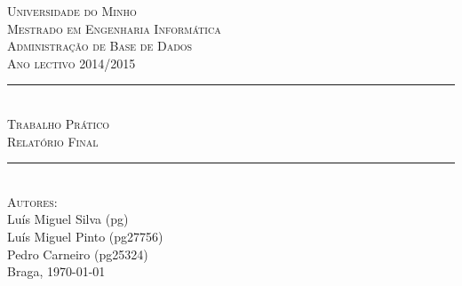 \begin{titlepage}
\onehalfspacing

\newcommand{\HRule}{\rule{\linewidth}{0.5mm}} %

\center %
 

\textsc{\LARGE Universidade do Minho}\\[1.5cm] %
\textsc{\Large Mestrado em Engenharia Informática}\\[0.5cm] %
\textsc{\large Administração de Base de Dados}\\[0.5cm] %
\textsc{Ano lectivo 2014/2015}\\[0.5cm]


\HRule \\[0.4cm]
\textsc{\Large Trabalho Prático}\\[0.4cm] %
\textsc{ \large Relatório Final}\\[0.4cm] %
\HRule \\[1.5cm]
 

\textsc{\large Autores:}\\
{
Luís Miguel Silva (pg) \\
Luís Miguel Pinto (pg27756) \\
Pedro Carneiro (pg25324)
}\\[1cm] %


Braga, {\large \today}\\[1cm] %


\end{titlepage}
